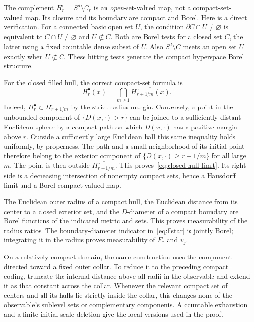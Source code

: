 \documentclass[11pt,reqno]{amsart}
\theoremstyle{plain}
\theoremstyle{definition}
\theoremstyle{remark}
\newcommand{\1}{\mathbf{1}}
\begin{document}
The complement $H_r^\circ=S^d\setminus C_r$ is an \emph{open}-set-valued map, not a compact-set-valued map. Its closure and its boundary are compact and Borel. Here is a direct verification. For a connected basic open set $U$, the condition $\partial C\cap U\ne\varnothing$ is equivalent to $C\cap U\ne\varnothing$ and $U\not\subset C$. Both are Borel tests for a closed set $C$, the latter using a fixed countable dense subset of $U$. Also $\overline{S^d\setminus C}$ meets an open set $U$ exactly when $U\not\subset C$. These hitting tests generate the compact hyperspace Borel structure.

For the closed filled hull, the correct compact-set formula is
\begin{equation}\label{eq:closed-hull-limit}
H_r^\bullet(x)=\bigcap_{m\ge1}\overline{H_{r+1/m}^\circ(x)}.
\end{equation}
Indeed, $H_r^\bullet\subset H_{r+1/m}^\circ$ by the strict radius margin. Conversely, a point in the unbounded component of $\{D(x,\cdot)>r\}$ can be joined to a sufficiently distant Euclidean sphere by a compact path on which $D(x,\cdot)$ has a positive margin above $r$. Outside a sufficiently large Euclidean ball this same inequality holds uniformly, by properness. The path and a small neighborhood of its initial point therefore belong to the exterior component of $\{D(x,\cdot)\ge r+1/m\}$ for all large $m$. The point is then outside $\overline{H_{r+1/m}^\circ}$. This proves~\eqref{eq:closed-hull-limit}. Its right side is a decreasing intersection of nonempty compact sets, hence a Hausdorff limit and a Borel compact-valued map.

The Euclidean outer radius of a compact hull, the Euclidean distance from its center to a closed exterior set, and the $D$-diameter of a compact boundary are Borel functions of the indicated metric and sets. This proves measurability of the radius ratios. The boundary-diameter indicator in~\eqref{eq:Fstar} is jointly Borel; integrating it in the radius proves measurability of $F_*$ and $v_j$.

On a relatively compact domain, the same construction uses the component directed toward a fixed outer collar. To reduce it to the preceding compact coding, truncate the internal distance above all radii in the observable and extend it as that constant across the collar. Whenever the relevant compact set of centers and all its hulls lie strictly inside the collar, this changes none of the observable's sublevel sets or complementary components. A countable exhaustion and a finite initial-scale deletion give the local versions used in the proof.
\end{document}
